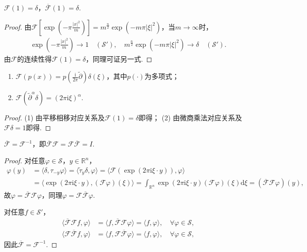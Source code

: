 \documentclass[../../main.tex]{subfiles}%
\begin{document}
\begin{proposition}
$\mathscr{F}(1)=\delta$，$\overline{\mathscr{F}}(1)=\delta$.
\end{proposition}
\begin{proof}
由$\mathscr{F}\left[\exp\left(-\pi\frac{|x|^2}{m}\right)\right]=m^{\frac{n}{2}}\exp(-m\pi|\xi|^2)$，当$m\to\infty$时，
\begin{align*}
\exp\left(-\pi\frac{|x|^2}{m}\right)\to1\quad(\mathscr{S}'),\quad m^{\frac{n}{2}}\exp(-m\pi|\xi|^2)\to\delta\quad(\mathscr{S}').
\end{align*}
由$\mathscr{F}$的连续性得$\mathscr{F}(1)=\delta$，同理可证另一式.
\end{proof}

\begin{proposition}
\begin{enumerate}[(1)]
\item $\mathscr{F}(p(x))=p\left(\frac{\mathrm{i}}{2\pi}\widetilde{\partial}\right)\delta(\xi)$，其中$p(\cdot)$为多项式；
\item $\mathscr{F}(\widetilde{\partial}^\alpha\delta)=(2\pi\mathrm{i}\xi)^\alpha$.
\end{enumerate}
\end{proposition}
\begin{proof}
(1) 由平移相移对应关系及$\mathscr{F}(1)=\delta$即得；
(2) 由微商乘法对应关系及$\mathscr{F}\delta=1$即得.
\end{proof}

\begin{theorem}
$\overline{\mathscr{F}}=\mathscr{F}^{-1}$，即$\overline{\mathscr{F}}\mathscr{F}=\mathscr{F}\overline{\mathscr{F}}=I$.
\end{theorem}
\begin{proof}
对任意$\varphi\in\mathscr{S}$，$y\in\mathbb{R}^n$，
\begin{align*}
\varphi(y)&=\langle\delta,\tau_{-y}\varphi\rangle=\langle\widetilde{\tau}_y\delta,\varphi\rangle
=\langle\mathscr{F}(\exp(2\pi\mathrm{i}\xi\cdot y)),\varphi\rangle\\
&=\langle\exp(2\pi\mathrm{i}\xi\cdot y),(\mathscr{F}\varphi)(\xi)\rangle
=\int_{\mathbb{R}^n}\exp(2\pi\mathrm{i}\xi\cdot y)(\mathscr{F}\varphi)(\xi)\mathrm{d}\xi=(\overline{\mathscr{F}}\mathscr{F}\varphi)(y),
\end{align*}
故$\varphi=\overline{\mathscr{F}}\mathscr{F}\varphi$，同理$\varphi=\mathscr{F}\overline{\mathscr{F}}\varphi$.

对任意$f\in\mathscr{S}'$，
\begin{align*}
\langle\overline{\mathscr{F}}\mathscr{F}f,\varphi\rangle&=\langle f,\overline{\mathscr{F}}\mathscr{F}\varphi\rangle=\langle f,\varphi\rangle,\quad \forall\varphi\in\mathscr{S},\\
\langle\mathscr{F}\overline{\mathscr{F}}f,\varphi\rangle&=\langle f,\mathscr{F}\overline{\mathscr{F}}\varphi\rangle=\langle f,\varphi\rangle,\quad \forall\varphi\in\mathscr{S},
\end{align*}
因此$\overline{\mathscr{F}}=\mathscr{F}^{-1}$.
\end{proof}
\end{document}

